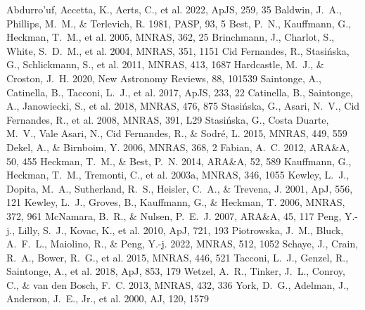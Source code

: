 \documentclass[twocolumn]{aastex631}
\begin{document}

\begin{thebibliography}{}
 Abdurro'uf, Accetta, K., Aerts, C., et al. 2022, ApJS, 259, 35
 Baldwin, J.~A., Phillips, M.~M., \& Terlevich, R. 1981, PASP, 93, 5
 Best, P.~N., Kauffmann, G., Heckman, T.~M., et al. 2005, MNRAS, 362, 25
 Brinchmann, J., Charlot, S., White, S.~D.~M., et al. 2004, MNRAS, 351, 1151
 Cid Fernandes, R., Stasi{\'n}ska, G., Schlickmann, S., et al. 2011, MNRAS, 413, 1687
 Hardcastle, M.~J., \& Croston, J.~H. 2020, New Astronomy Reviews, 88, 101539
 Saintonge, A., Catinella, B., Tacconi, L.~J., et al. 2017, ApJS, 233, 22
 Catinella, B., Saintonge, A., Janowiecki, S., et al. 2018, MNRAS, 476, 875
 Stasi{\'n}ska, G., Asari, N.~V., Cid Fernandes, R., et al. 2008, MNRAS, 391, L29
 Stasi{\'n}ska, G., Costa Duarte, M.~V., Vale Asari, N., Cid Fernandes, R., \& Sodr{\'e}, L. 2015, MNRAS, 449, 559
 Dekel, A., \& Birnboim, Y. 2006, MNRAS, 368, 2
 Fabian, A.~C. 2012, ARA\&A, 50, 455
 Heckman, T.~M., \& Best, P.~N. 2014, ARA\&A, 52, 589
 Kauffmann, G., Heckman, T.~M., Tremonti, C., et al. 2003a, MNRAS, 346, 1055
 Kewley, L.~J., Dopita, M.~A., Sutherland, R.~S., Heisler, C.~A., \& Trevena, J. 2001, ApJ, 556, 121
 Kewley, L.~J., Groves, B., Kauffmann, G., \& Heckman, T. 2006, MNRAS, 372, 961
 McNamara, B.~R., \& Nulsen, P.~E.~J. 2007, ARA\&A, 45, 117
 Peng, Y.-j., Lilly, S.~J., Kovac, K., et al. 2010, ApJ, 721, 193
 Piotrowska, J.~M., Bluck, A.~F.~L., Maiolino, R., \& Peng, Y.-j. 2022, MNRAS, 512, 1052
 Schaye, J., Crain, R.~A., Bower, R.~G., et al. 2015, MNRAS, 446, 521
 Tacconi, L.~J., Genzel, R., Saintonge, A., et al. 2018, ApJ, 853, 179
 Wetzel, A.~R., Tinker, J.~L., Conroy, C., \& van den Bosch, F.~C. 2013, MNRAS, 432, 336
 York, D.~G., Adelman, J., Anderson, J.~E., Jr., et al. 2000, AJ, 120, 1579
\end{thebibliography}
\end{document}
